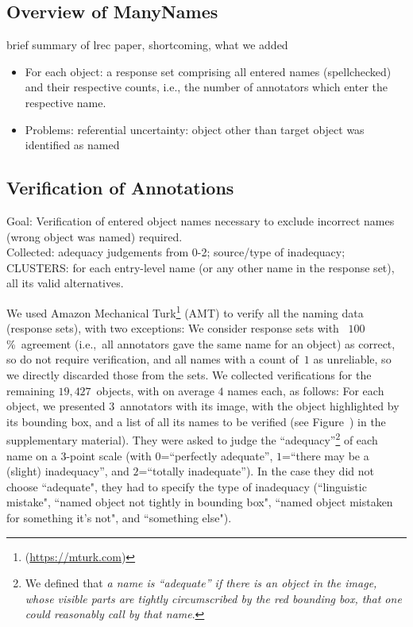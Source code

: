 \subsection{Overview of ManyNames}
\label{sect:mn_overview}

brief summary of lrec paper, shortcoming, what we added

\begin{itemize}
	\item For each object: a response set comprising all entered names (spellchecked) and their respective counts, i.e., the number of annotators which enter the respective name.
	\item Problems: referential uncertainty: object other than target object was  identified as named
\end{itemize}

\subsection{Verification of Annotations}
\label{sect:mn_verification}
Goal: Verification of entered object names necessary to exclude incorrect names (wrong object was named) required. \\
Collected: adequacy judgements from 0-2; source/type of inadequacy; CLUSTERS: for each entry-level name (or any other name in the response set), all its valid alternatives.

We used Amazon Mechanical Turk\footnote{(\url{https://mturk.com})} (AMT) to verify all the \mn naming data (response sets), with two exceptions: We consider response sets with ~$100$\%~agreement (i.e.,~all annotators gave the same name for an object) as correct, so do not require verification, and all names with a count of~$1$ as unreliable, so we directly discarded those from the sets.
We collected verifications for the remaining $19,427$~objects, with on average $4$ names each, as follows: 
For each object, we presented $3$~annotators with its image, with the object highlighted by its bounding box, and a list of all its names to be verified (see Figure~) in the supplementary material).
They were asked to judge the ``adequacy''\footnote{We defined that \textit{a name is   ``adequate'' if there is an object in the image, whose visible parts are tightly circumscribed by the red bounding box, that one could reasonably call by that name}.} of each name on a 3-point scale (with $0$=``perfectly adequate'', $1$=``there may be a (slight) inadequacy'', and $2$=``totally inadequate''). 
In the case they did not choose ``adequate", they had to specify the type of inadequacy (``linguistic mistake", ``named object not tightly in bounding box",  ``named object mistaken for something it's not", and ``something else"). 

